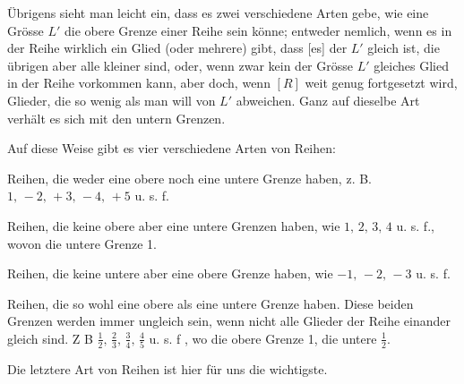 \indent Übrigens sieht man leicht ein, dass es zwei verschiedene Arten gebe, wie eine Grösse \(L'\) die obere Grenze einer Reihe sein könne; entweder nemlich, wenn es in der Reihe wirklich ein Glied (oder mehrere) gibt, dass [es] der \(L'\) gleich ist, die übrigen aber alle kleiner sind, oder, wenn zwar kein der Grösse \(L'\) gleiches Glied in der Reihe vorkommen kann, aber doch, wenn \([R]\) weit genug fortgesetzt wird, Glieder, die so wenig als man will von \(L'\) abweichen. Ganz auf dieselbe Art verhält es sich mit den untern Grenzen.

\indent Auf diese Weise gibt es vier verschiedene Arten von Reihen:
\begin{list}{}{\setlength{\leftmargin}{3em}\setlength{\labelwidth}{2.5em}\setlength{\labelsep}{.5em}\setlength{\itemsep}{.35em}\setlength{\parsep}{0pt}}
\item[I.] Reihen, die weder eine obere noch eine untere Grenze haben, z. B. \(1,\allowbreak\,-2,\allowbreak\,+3,\allowbreak\,-4,\allowbreak\,+5\) u. s. f.
\item[II.] Reihen, die keine obere aber eine untere Grenzen haben, wie \(1,\,2,\,3,\,4\) u. s. f., wovon die untere Grenze 1.
\item[III.] Reihen, die keine untere aber eine obere Grenze haben, wie \(-1,\,-2,\,-3\) u. s. f.
\item[IV.] Reihen, die so wohl eine obere als eine untere Grenze haben. Diese beiden Grenzen werden immer ungleich sein, wenn nicht alle Glieder der Reihe einander gleich sind. Z B \(\frac12,\,\frac23,\,\frac34,\,\frac45\) u. s. f , wo die obere Grenze 1, die untere \(\frac12\).
\end{list}
\indent Die letztere Art von Reihen ist hier für uns die wichtigste.

